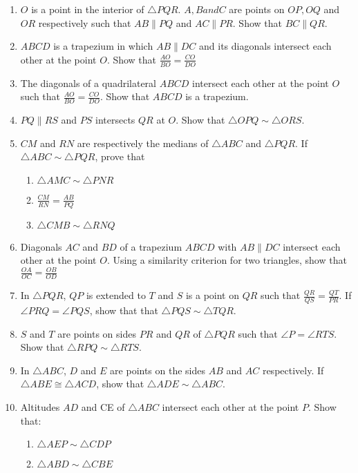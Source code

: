 \begin{enumerate}[label=\arabic*.,ref=\thesubsection.\theenumi]
\item $O$ is a point in the interior of $\triangle PQR$.  $A, B and C$ are points on $OP, OQ$ and $OR$ respectively such that $AB  \parallel  PQ$ and $AC  \parallel  PR$. Show that $BC  \parallel  QR$.
%
\item $ABCD$ is a trapezium in which $AB  \parallel  DC$ and its diagonals intersect each other at the point $O$. Show
that
$\frac{AO}{ BO}=\frac{CO}{  DO}$
%
\item The diagonals of a quadrilateral $ABCD$ intersect each other at the point $O$ such that $\frac{AO}{ BO}=\frac{CO}{  DO}$.   Show that $ABCD$ is a trapezium.
%
\item $PQ \parallel RS$ and $PS$ intersects $QR$ at $O$.  Show that $\triangle OPQ \sim \triangle ORS$.
 \item $CM$ and $RN$ are respectively the medians of $ \triangle  ABC$ and $ \triangle  PQR$. If $ \triangle  ABC  \sim   \triangle  PQR$, prove that 
\begin{enumerate}
\item  $ \triangle  AMC  \sim   \triangle  PNR$ 
\item  $\frac{CM}{RN}=\frac{ AB}{  PQ}$
\item $ \triangle  CMB  \sim   \triangle  RNQ$
%
\end{enumerate}
\item Diagonals $AC$ and $BD$ of a trapezium $ABCD$ with $AB  \parallel  DC$ intersect each other at the point $O$. Using a similarity criterion for two triangles, show that
$\frac{OA}{OC} =  \frac{OB}  {OD}$
%
\item In $\triangle PQR$, $QP$ is extended to $T$ and $S$ is a point on $QR$ such that $ \frac{QR}{QS}=\frac{ QT}{  PR}$. If $\angle PRQ = \angle PQS$, show that 
 that  $\triangle  PQS  \sim   \triangle  TQR$.
\item $S$ and $T$ are points on sides $PR$ and $QR$ of $\triangle PQR$ such that $\angle P = \angle 
 RTS$. Show that $\triangle RPQ \sim \triangle RTS$.
\item  In $\triangle ABC$, $D$ and $E$ are points on the sides $AB$ and $AC$ respectively.  If  $\triangle  ABE \cong   \triangle  ACD$, show that  $\triangle  ADE  \sim   \triangle  ABC$.
\item   Altitudes $AD$ and CE of  $\triangle  ABC$ intersect each other at the point $P$. Show that:
%
\begin{enumerate}
\item   $\triangle  AEP  \sim   \triangle  CDP $
\item   $\triangle  ABD  \sim   \triangle  CBE $

\end{enumerate}
\end{enumerate}
